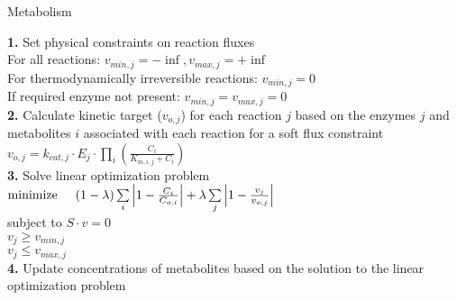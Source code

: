 \documentclass[12pt]{article}
\begin{document}
\newpage
 \begin{algorithm}[H]
\caption{Metabolism}
\label{metabolism_algorithm}
\textbf{1.} Set physical constraints on reaction fluxes\\
\-\hspace{1 cm}For all reactions: $v_{min,j} = -\inf, v_{max,j} = +\inf$\\
\-\hspace{1 cm}For thermodynamically irreversible reactions: $v_{min,j} = 0$\\
\-\hspace{1 cm}If required enzyme not present: $v_{min,j} = v_{max,j} = 0$\\
\textbf{2.} Calculate kinetic target ($v_{o,j}$) for each reaction $j$ based on the enzymes $j$ and metabolites $i$ associated with each reaction for a soft flux constraint\\
\-\hspace{1 cm} $v_{o,j}=k_{cat,j} \cdot E_j \cdot \prod\limits_i ( \frac{C_i}{K_{m,i,j} + C_i} )$\\
\textbf{3.} Solve linear optimization problem\\
\-\hspace{1 cm} $\mathrm{minimize} \hspace{0.5 cm} (1-\lambda)\sum\limits_i \left| 1-\frac{C_i}{C_{o,i}} \right| + \lambda \sum\limits_j \left| 1-\frac{v_j}{v_{o,j}} \right|$\\
\-\hspace{1 cm} subject to \hspace{0.5 cm}$S\cdot v = 0$\\
\-\hspace{3.2 cm} $v_j \geq v_{min,j}$\\
\-\hspace{3.2 cm} $v_j \leq v_{max,j}$\\
\textbf{4.} Update concentrations of metabolites based on the solution to the linear optimization problem\\
 \end{algorithm}
\end{document}
